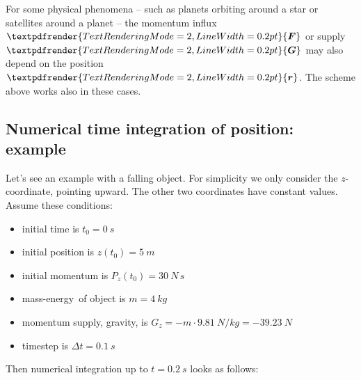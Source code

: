 \documentclass[a4paper,12pt,%
onecolumn,oneside,%
british%
]{memoir}
\renewcommand*{\bm}[1]{\textpdfrender{TextRenderingMode=2,LineWidth=0.2pt}{\boldsymbol{#1}}}
\newcommand*{\incr}{\Delta}%
\renewcommand*{\|}[1][]{\nonscript\:#1\vert\nonscript\:\mathopen{}}
\newcommand*{\masse}{mass-energy}
\newcommand*{\yr}{\bm{r}}
\newcommand*{\yti}{t_{0}}
\newcommand*{\Dt}{\incr t}
\newcommand*{\ym}{m}%
\newcommand*{\yF}{\bm{F}}
\newcommand*{\yG}{\bm{G}}
\begin{document}
For some physical phenomena -- such as planets orbiting around a star or satellites around a planet -- the momentum influx $\yF$ or supply $\yG$ may also depend on the position $\yr$. The scheme above works also in these cases.

\subsection{Numerical time integration of position: example}
\label{sec:example_falling_object_timestep}

Let's see an example with a falling object. For simplicity we only consider the $z$-coordinate, pointing upward. The other two coordinates have constant values. Assume these conditions:
\begin{itemize}[nosep]
\item initial time is $\yti=\qty{0}{s}$
\item initial position is $z(\yti)=\qty{5}{m}$
\item initial momentum is $P_{z}(\yti)=\qty{30}{N\,s}$
\item \masse\ of object is $\ym=\qty{4}{kg}$
\item momentum supply, gravity, is $G_{z}=-\ym\cdot\qty{9.81}{N/kg} = \qty{-39.23}{N}$
\item timestep is $\Dt = \qty{0.1}{s}$
\end{itemize}
Then numerical integration up to $t=\qty{0.2}{s}$ looks as follows:\noprelistbreak
\end{document}
